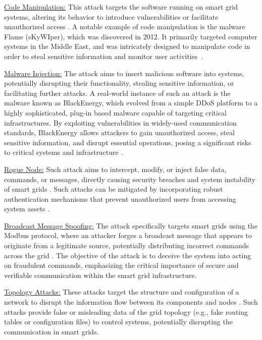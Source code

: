 \documentclass[10pt, journal]{IEEEtran}
\begin{document}
\underline{Code Manipulation:} This attack targets the software running on smart grid systems, altering its behavior to introduce vulnerabilities or facilitate unauthorized access \cite{musleh2019survey}. A notable example of code manipulation is the malware Flame (sKyWIper), which was discovered in 2012. It primarily targeted computer systems in the Middle East, and was intricately designed to manipulate code in order to steal sensitive information and monitor user activities~\cite{bencsath2012cousins}. 
			
\underline{Malware Injection:} The attack aims to insert malicious software into systems, potentially disrupting their functionality, stealing sensitive information, or facilitating further attacks. A real-world instance of such an attack is the malware known as BlackEnergy, which evolved from a simple DDoS platform to a highly sophisticated, plug-in based malware capable of targeting critical infrastructures. By exploiting vulnerabilities in widely-used communication standards, BlackEnergy allows attackers to gain unauthorized access, steal sensitive information, and disrupt essential operations, posing a significant risks to critical systems and infrastructure \cite{khan2016threat}.  

\underline{Rogue Node:} Such attack aims to intercept, modify, or inject false data, commands, or messages, directly causing security breaches and system instability of smart grids \cite{alrawais2017fog}. Such attacks can be mitigated by incorporating robust authentication mechanisms that prevent unauthorized users from accessing system assets \cite{zaidi2015host, sahu2017detection}.		

\underline{Broadcast Message Spoofing:} The attack specifically targets smart grids using the Modbus protocol, where an attacker forges a broadcast message that appears to originate from a legitimate source, potentially distributing incorrect commands across the grid \cite{huitsing2008attack}. The objective of the attack is to deceive the system into acting on fraudulent commands, emphasizing the critical importance of secure and verifiable communication within the smart grid infrastructure.
			
\underline{Topology Attacks:} These attacks target the structure and configuration of a network to disrupt the information flow between its components and nodes \cite{kim2013topology,liu2016local}. Such attacks provide false or misleading data of the grid topology (e.g., fake routing tables or configuration files) to control systems, potentially disrupting the communication in smart grids. 
			
\end{document}
